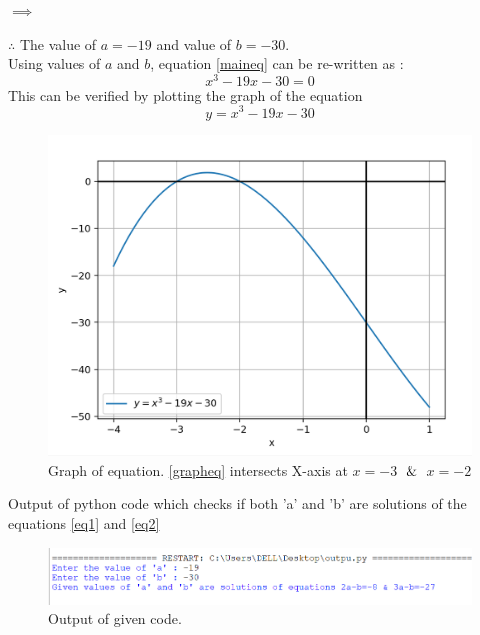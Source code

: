 \documentclass[journal,12pt,twocolumn]{IEEEtran}
\begin{document}
    $\implies$
    
    

    $ \therefore $ The value of $a = -19$ and value of $b = -30$.\\
    
    Using values of $a$ and $b$, equation \eqref{maineq} can be re-written as :
    \begin{equation}
    \label{Peq}
        x^3-19x-30=0
    \end{equation}
    This can be verified by plotting the graph of the equation
    \begin{equation}
    \label{grapheq}
        y=x^3-19x-30
    \end{equation}
    
\begin{figure}[h]
    \includegraphics[width=0.9\columnwidth]{figs/graph.png}
    \caption{Graph of equation. \eqref{grapheq} intersects X-axis at $x=-3$ $\And$ $x=-2$ }
    \label{graph}

\end{figure}
\newpage
Output of python code which checks if both 'a' and 'b' are solutions of the equations \eqref{eq1} and \eqref{eq2}
\begin{figure}[h]
    \centering
    \includegraphics[width=\columnwidth]{figs/output.png}
    \caption{Output of given code.}
    \label{op}
\end{figure}
\end{document}
